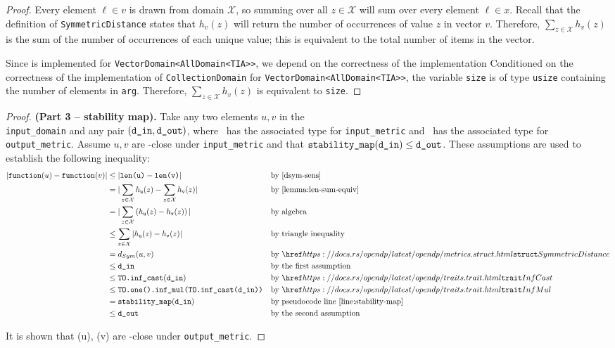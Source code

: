 \documentclass{article}
\begin{document}
\begin{proof}
    Every element $\ell \in v$ is drawn from domain $\mathcal{X}$, so summing over all $z\in \mathcal{X}$ will sum over every element $\ell\in x$. 
    Recall that the definition of \texttt{SymmetricDistance} states that $h_v(z)$ will return the number of occurrences of value $z$ in vector $v$.
    Therefore, $\sum_{z\in\mathcal{X}} h_v(z)$ is the sum of the number of occurrences of each unique value; 
    this is equivalent to the total number of items in the vector. 

    Since  is implemented for \texttt{VectorDomain<AllDomain<TIA>>}, 
    we depend on the correctness of the implementation 
    Conditioned on the correctness of the implementation of \texttt{CollectionDomain} for \texttt{VectorDomain<AllDomain<TIA>>},
    the variable \texttt{size} is of type \texttt{usize} containing the number of elements in \texttt{arg}.
    Therefore, $\sum_{z\in\mathcal{X}} h_v(z)$ is equivalent to \texttt{size}.
\end{proof}

\begin{proof} \textbf{(Part 3 -- stability map).} 
    Take any two elements $u, v$ in the \\\texttt{input\_domain} and any pair $(\texttt{d\_in}, \texttt{d\_out})$, 
    where \din\ has the associated type for \texttt{input\_metric} and \dout\ has the associated type for \texttt{output\_metric}.
    Assume $u, v$ are \din-close under \texttt{input\_metric} and that $\texttt{stability\_map}(\texttt{d\_in}) \leq \texttt{d\_out}$. 
    These assumptions are used to establish the following inequality:
    \begin{align*}
        |\function(u) - \function(v)| &\leq |\texttt{len(u)} - \texttt{len(v)}| &&\text{by }\ref{dsym-sens} \\
        &= |\sum_{z\in \mathcal{X}} h_{\texttt{u}}(z) - \sum_{z\in \mathcal{X}} h_{\texttt{v}}(z)| &&\text{by } \ref{lemma:len-sum-equiv} \\
        &= |\sum_{z\in \mathcal{X}}\left(h_{\texttt{u}}(z) - h_{\texttt{v}}(z)\right)| &&\text{by algebra} \\
        &\leq \sum_{z\in \mathcal{X}}|h_{\texttt{u}}(z) - h_{\texttt{v}}(z)| &&\text{by triangle inequality} \\
        &= d_{Sym}(u, v) &&\text{by } \rustdoc{metrics}{struct}{SymmetricDistance}\\
        &\leq \din &&\text{by the first assumption} \\
        &\leq \texttt{TO.inf\_cast}(\din) &&\text{by } \rustdoc{traits}{trait}{InfCast} \\
        &\leq \texttt{TO.one().inf\_mul(TO.inf\_cast(\din))} &&\text{by } \rustdoc{traits}{trait}{InfMul} \\
        &=\texttt{stability\_map}(\din) &&\text{by pseudocode line } \ref{line:stability-map} \\
        &\leq \dout &&\text{by the second assumption}
    \end{align*}

    It is shown that \function(u), \function(v) are \dout-close under \texttt{output\_metric}.
\end{proof}
\end{document}
